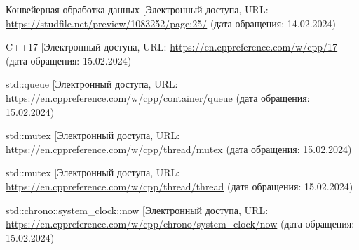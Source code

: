 \renewcommand\bibname{\centerline{СПИСОК ИСПОЛЬЗОВАННЫХ ИСТОЧНИКОВ}}

\begin{thebibliography}{3}
	\makeatletter
	\def\@biblabel#1{#1. }
	
	Конвейерная обработка данных [Электронный \text{ресурс]. -- Режим} доступа, URL: \url{https://studfile.net/preview/1083252/page:25/} (дата обращения: 14.02.2024)
	
	C++17 [Электронный \text{ресурс]. -- Режим} доступа, URL: \url{https://en.cppreference.com/w/cpp/17} (дата обращения: 15.02.2024)
	
	std::queue [Электронный \text{ресурс]. -- Режим} доступа, URL: \url{https://en.cppreference.com/w/cpp/container/queue} (дата обращения: 15.02.2024)
	
	std::mutex [Электронный \text{ресурс]. -- Режим} доступа, URL: \url{https://en.cppreference.com/w/cpp/thread/mutex} (дата обращения: 15.02.2024)
	
	std::mutex [Электронный \text{ресурс]. -- Режим} доступа, URL: \url{https://en.cppreference.com/w/cpp/thread/thread} (дата обращения: 15.02.2024)
	
	std::chrono::system\_clock::now [Электронный \text{ресурс]. -- Режим} доступа, URL: \url{https://en.cppreference.com/w/cpp/chrono/system_clock/now} (дата обращения: 15.02.2024)
	
\end{thebibliography}